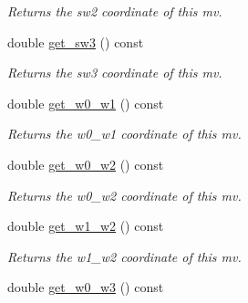 \begin{DoxyCompactItemize}
\begin{DoxyCompactList}\small\item\em Returns the sw2 coordinate of this mv. \end{DoxyCompactList}\item 
\hypertarget{classe3ga_1_1mv_a6640e4a79d7c359ed873131903caed30}{double \hyperlink{classe3ga_1_1mv_a6640e4a79d7c359ed873131903caed30}{get\-\_\-sw3} () const }\label{classe3ga_1_1mv_a6640e4a79d7c359ed873131903caed30}

\begin{DoxyCompactList}\small\item\em Returns the sw3 coordinate of this mv. \end{DoxyCompactList}\item 
\hypertarget{classe3ga_1_1mv_a5f9349b8489fe9c73e8b534f1c0af2cb}{double \hyperlink{classe3ga_1_1mv_a5f9349b8489fe9c73e8b534f1c0af2cb}{get\-\_\-w0\-\_\-w1} () const }\label{classe3ga_1_1mv_a5f9349b8489fe9c73e8b534f1c0af2cb}

\begin{DoxyCompactList}\small\item\em Returns the w0\-\_\-w1 coordinate of this mv. \end{DoxyCompactList}\item 
\hypertarget{classe3ga_1_1mv_a354c24a4a34a8524cdad4767a71952f8}{double \hyperlink{classe3ga_1_1mv_a354c24a4a34a8524cdad4767a71952f8}{get\-\_\-w0\-\_\-w2} () const }\label{classe3ga_1_1mv_a354c24a4a34a8524cdad4767a71952f8}

\begin{DoxyCompactList}\small\item\em Returns the w0\-\_\-w2 coordinate of this mv. \end{DoxyCompactList}\item 
\hypertarget{classe3ga_1_1mv_adb62160e6d80bd26bab4aceac2d05e8e}{double \hyperlink{classe3ga_1_1mv_adb62160e6d80bd26bab4aceac2d05e8e}{get\-\_\-w1\-\_\-w2} () const }\label{classe3ga_1_1mv_adb62160e6d80bd26bab4aceac2d05e8e}

\begin{DoxyCompactList}\small\item\em Returns the w1\-\_\-w2 coordinate of this mv. \end{DoxyCompactList}\item 
\hypertarget{classe3ga_1_1mv_ac04e2b04ebd5d1579df9ec44af3df823}{double \hyperlink{classe3ga_1_1mv_ac04e2b04ebd5d1579df9ec44af3df823}{get\-\_\-w0\-\_\-w3} () const }\label{classe3ga_1_1mv_ac04e2b04ebd5d1579df9ec44af3df823}


\end{DoxyCompactItemize}
